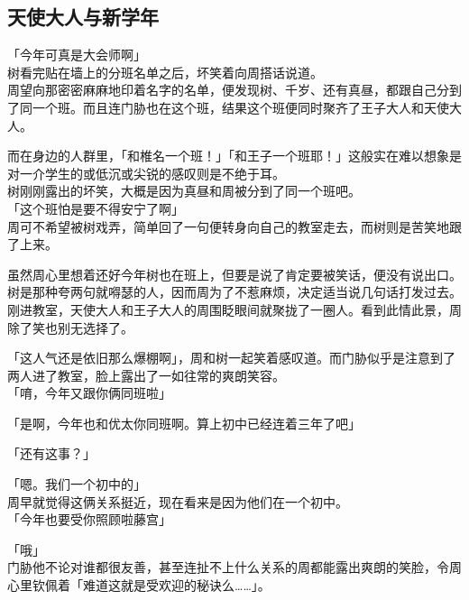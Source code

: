 \subsection{天使大人与新学年}

「今年可真是大会师啊」\\

树看完贴在墙上的分班名单之后，坏笑着向周搭话说道。\\

周望向那密密麻麻地印着名字的名单，便发现树、千岁、还有真昼，都跟自己分到了同一个班。而且连门胁也在这个班，结果这个班便同时聚齐了王子大人和天使大人。

而在身边的人群里，「和椎名一个班！」「和王子一个班耶！」这般实在难以想象是对一介学生的或低沉或尖锐的感叹则是不绝于耳。\\

树刚刚露出的坏笑，大概是因为真昼和周被分到了同一个班吧。\\

「这个班怕是要不得安宁了啊」\\

周可不希望被树戏弄，简单回了一句便转身向自己的教室走去，而树则是苦笑地跟了上来。

虽然周心里想着还好今年树也在班上，但要是说了肯定要被笑话，便没有说出口。树是那种夸两句就嘚瑟的人，因而周为了不惹麻烦，决定适当说几句话打发过去。\\

刚进教室，天使大人和王子大人的周围眨眼间就聚拢了一圈人。看到此情此景，周除了笑也别无选择了。

「这人气还是依旧那么爆棚啊」，周和树一起笑着感叹道。而门胁似乎是注意到了两人进了教室，脸上露出了一如往常的爽朗笑容。\\

「唷，今年又跟你俩同班啦」

「是啊，今年也和优太你同班啊。算上初中已经连着三年了吧」

「还有这事？」

「嗯。我们一个初中的」\\

周早就觉得这俩关系挺近，现在看来是因为他们在一个初中。\\

「今年也要受你照顾啦藤宫」

「哦」\\

门胁他不论对谁都很友善，甚至连扯不上什么关系的周都能露出爽朗的笑脸，令周心里钦佩着「难道这就是受欢迎的秘诀么……」。\\

